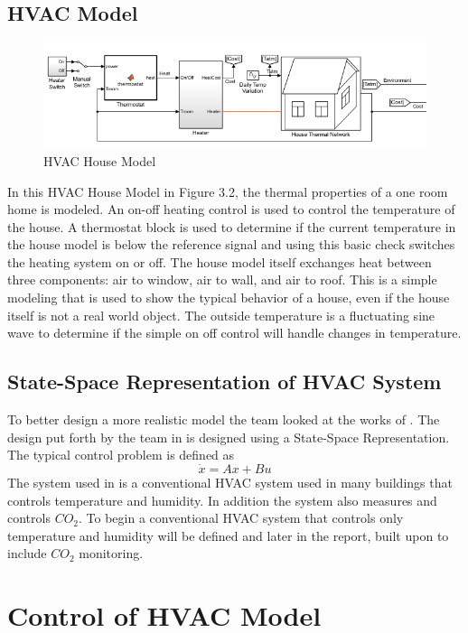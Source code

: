 \subsection{HVAC Model}
\begin{figure}
    \centering
    \includegraphics[scale = 0.85]{figs/img/houseModel.PNG}
    \caption{HVAC House Model}
    \label{fig:my_label}
\end{figure}
In this HVAC House Model in Figure 3.2, the thermal properties of a one room home is modeled. An on-off heating control is used to control the temperature of the house. A thermostat block is used to determine if the current temperature in the house model is below the reference signal and using this basic check switches the heating system on or off. The house model itself exchanges heat between three components: air to window, air to wall, and air to roof. This is a simple modeling that is used to show the typical behavior of a house, even if the house itself is not a real world object. The outside temperature is a fluctuating sine wave to determine if the simple on off control will handle changes in temperature. 

\subsection{State-Space Representation of HVAC System}
To better design a more realistic model the team looked at the works of \cite{Kang2014}. The design put forth by the team in \cite{Kang2014} is designed using a State-Space Representation. The typical control problem is defined as 
\begin{equation}
    \Dot{x} = Ax+Bu
\end{equation}
The system used in \cite{Kang2014} is a conventional HVAC system used in many buildings that controls temperature and humidity. In addition the system also measures and controls $CO_2$. 
\newline
To begin a conventional HVAC system that controls only temperature and humidity will be defined and later in the report, built upon to include $CO_2$ monitoring. 

\section{Control of HVAC Model}

